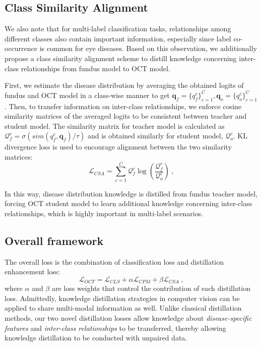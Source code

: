 \documentclass[runningheads]{llncs}
\newcommand{\wdai}[1]{{\color[rgb]{0.9,0.1,0.1}{#1}}}
\newcommand{\wdaicmnt}[1]{{\color[rgb]{0.9,0.1,0.1}{(WD:#1)}}}
\begin{document}
\subsection{Class Similarity Alignment}
We also note that for multi-label classification tasks, relationships among different classes also contain important information, especially since label co-occurrence is common for eye diseases. Based on this observation, we additionally propose a class similarity alignment scheme to distill knowledge concerning inter-class relationships from fundus model to OCT model.

First, we estimate the disease distribution by averaging the obtained logits of fundus and OCT model in a class-wise manner to get $\boldsymbol{q}_f=\{q_f^c\}_{c=1}^C, \boldsymbol{q}_o=\{q_o^c\}_{c=1}^C$.
Then, to transfer information on inter-class relationships, we enforce cosine similarity matrices of the averaged logits to be consistent between teacher and student model. The similarity matrix for teacher model is calculated as $\mathcal{Q}_f^c=\sigma(sim(q_f^c, \boldsymbol{q}_f)/\tau)$ and is obtained similarly for student model, $\mathcal{Q}_o^c$. KL divergence loss 
is used to encourage alignment between the two similarity matrices:
\begin{equation}   \mathcal{L}_{CSA}=\sum_{c=1}^C{\mathcal{Q}_f^c\log{\left(\frac{\mathcal{Q}_f^c}{\mathcal{Q}_o^c}\right)} \:,}
\end{equation}


In this way, disease distribution knowledge is distilled from fundus teacher model, forcing OCT student model to learn additional knowledge concerning inter-class relationships, which is highly important in multi-label scenarios.

\subsection{Overall framework}
The overall loss is the combination of classification loss and distillation enhancement loss:
\begin{equation}
    \mathcal{L}_{OCT}=\mathcal{L}_{CLS} + \alpha\mathcal{L}_{CPM} + \beta\mathcal{L}_{CSA} \:,
\end{equation}
where $\alpha$ and $\beta$ are loss weights that control the contribution of each distillation loss. 
Admittedly, knowledge distillation strategies in computer vision \cite{romero2014fitnets,hinton2015distilling,park2019relational,shu2021channel,zhao2022decoupled,chen2022knowledge} can be applied to share multi-modal information as well. 
Unlike classical distillation methods, our two novel distillation losses allow knowledge about \textit{disease-specific features} and \textit{inter-class relationships} to be transferred, thereby allowing knowledge distillation to be conducted with unpaired data. 
\end{document}
